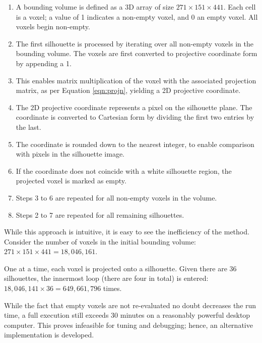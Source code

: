 \begin{enumerate}
  \item A bounding volume is defined as a 3D array of size $271\times151\times441$. Each cell is a voxel; a value of 1 indicates a non-empty voxel, and 0 an empty voxel. All voxels begin non-empty.

  \item The first silhouette is processed by iterating over all non-empty voxels in the bounding volume. The voxels are first converted to projective coordinate form by appending a 1.

  \item This enables matrix multiplication of the voxel with the associated projection matrix, as per Equation \ref{eqn:projn}, yielding a 2D projective coordinate.

  \item The 2D projective coordinate represents a pixel on the silhouette plane. The coordinate is converted to Cartesian form by dividing the first two entries by the last.

  \item The coordinate is rounded down to the nearest integer, to enable comparison with pixels in the silhouette image.

  \item If the coordinate does not coincide with a white silhouette region, the projected voxel is marked as empty.

  \item Steps 3 to 6 are repeated for all non-empty voxels in the volume.

  \item Steps 2 to 7 are repeated for all remaining silhouettes.

\end{enumerate}

While this approach is intuitive, it is easy to see the inefficiency of the method. Consider the number of voxels in the initial bounding volume: $271\times151\times441=18,046,161$.

One at a time, each voxel is projected onto a silhouette. Given there are 36 silhouettes, the innermost loop (there are four in total) is entered: $18,046,141\times36=649,661,796$ times.

While the fact that empty voxels are not re-evaluated no doubt decreases the run time, a full execution still exceeds 30 minutes on a reasonably powerful desktop computer. This proves infeasible for tuning and debugging; hence, an alternative implementation is developed.

